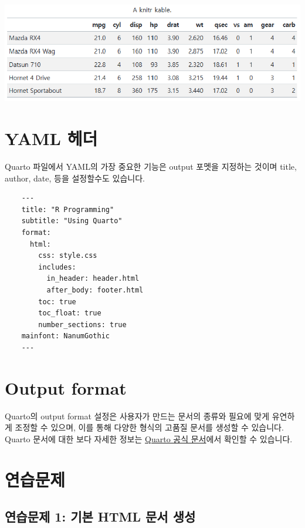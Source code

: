 \documentclass[
  a4paper,
]{book}
\begin{document}
\includegraphics{images/image-597049431.png}

\hypertarget{yaml-uxd5e4uxb354}{%
\section{YAML 헤더}\label{yaml-uxd5e4uxb354}}

Quarto 파일에서 YAML의 가장 중요한 기능은 output 포멧을 지정하는 것이며
title, author, date, 등을 설정할수도 있습니다.

\begin{verbatim}
    ---
    title: "R Programming"
    subtitle: "Using Quarto"
    format:
      html:
        css: style.css
        includes:
          in_header: header.html
          after_body: footer.html
        toc: true
        toc_float: true
        number_sections: true
    mainfont: NanumGothic
    ---
\end{verbatim}

\hypertarget{output-format}{%
\section{Output format}\label{output-format}}

Quarto의 output format 설정은 사용자가 만드는 문서의 종류와 필요에 맞게
유연하게 조정할 수 있으며, 이를 통해 다양한 형식의 고품질 문서를 생성할
수 있습니다. Quarto 문서에 대한 보다 자세한 정보는
\href{https://quarto.org/docs/guide/}{Quarto 공식 문서}에서 확인할 수
있습니다.

\hypertarget{uxc5f0uxc2b5uxbb38uxc81c}{%
\section{연습문제}\label{uxc5f0uxc2b5uxbb38uxc81c}}

\hypertarget{uxc5f0uxc2b5uxbb38uxc81c-1-uxae30uxbcf8-html-uxbb38uxc11c-uxc0dduxc131}{%
\subsection{연습문제 1: 기본 HTML 문서
생성}\label{uxc5f0uxc2b5uxbb38uxc81c-1-uxae30uxbcf8-html-uxbb38uxc11c-uxc0dduxc131}}
\end{document}

